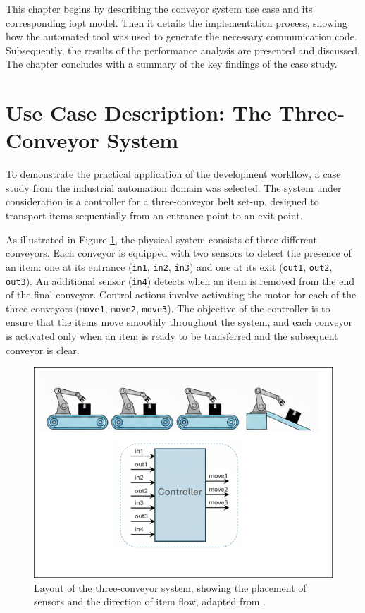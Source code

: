 This chapter begins by describing the conveyor system use case and its corresponding \gls{iopt} model. Then it details the implementation process, showing how the automated tool was used to generate the necessary communication code. Subsequently, the results of the performance analysis are presented and discussed. The chapter concludes with a summary of the key findings of the case study.


\section{Use Case Description: The Three-Conveyor System}
\label{sec:use_case_description}

To demonstrate the practical application of the development workflow, a case study from the industrial automation domain was selected. The system under consideration is a controller for a three-conveyor belt set-up, designed to transport items sequentially from an entrance point to an exit point.

As illustrated in Figure \ref{fig:conveyor_layout}, the physical system consists of three different conveyors. Each conveyor is equipped with two sensors to detect the presence of an item: one at its entrance (\texttt{in1}, \texttt{in2}, \texttt{in3}) and one at its exit (\texttt{out1}, \texttt{out2}, \texttt{out3}). An additional sensor (\texttt{in4}) detects when an item is removed from the end of the final conveyor. Control actions involve activating the motor for each of the three conveyors (\texttt{move1}, \texttt{move2}, \texttt{move3}). The objective of the controller is to ensure that the items move smoothly throughout the system, and each conveyor is activated only when an item is ready to be transferred and the subsequent conveyor is clear.

\begin{figure}[htb]
    \centering
    \includegraphics[width=0.6\columnwidth]{Chapters/Figures/layout.png}
    \caption{Layout of the three-conveyor system, showing the placement of sensors and the direction of item flow, adapted from \cite{tavaresgomes2026}.}
    \label{fig:conveyor_layout}
\end{figure}

